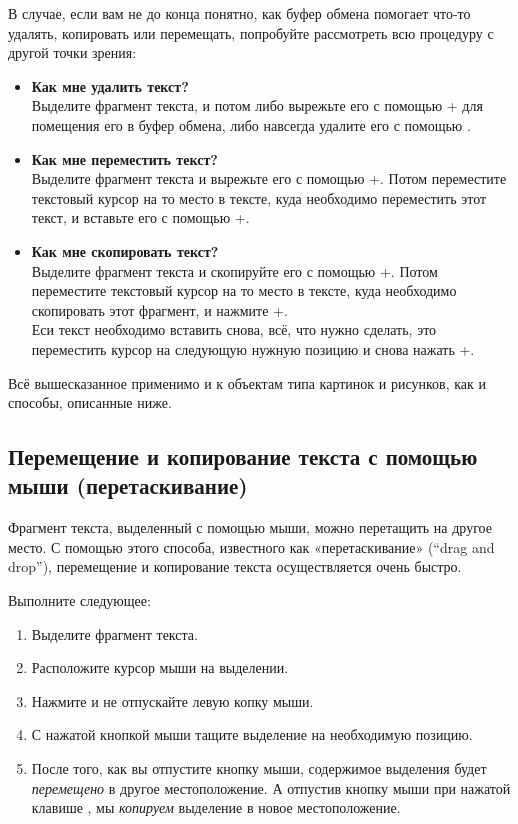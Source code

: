 \documentclass[a4paper,10pt]{article}
\begin{document}
В случае, если вам не до конца понятно, как буфер обмена помогает что-то удалять, копировать или перемещать, попробуйте рассмотреть всю процедуру с другой точки зрения:
\begin{itemize}
 \item \textbf{Как мне удалить текст?}\\
 Выделите фрагмент текста, и потом либо вырежьте его с помощью + для помещения его в буфер обмена, либо навсегда удалите его с помощью .
 \item \textbf{Как мне переместить текст?}\\
Выделите фрагмент текста и вырежьте его с помощью +. Потом переместите текстовый курсор на то место в тексте, куда необходимо переместить этот текст, и вставьте его с помощью +.
\item \textbf{Как мне скопировать текст?}\\
Выделите фрагмент текста и скопируйте его с помощью +. Потом переместите текстовый курсор на то место в тексте, куда необходимо скопировать этот фрагмент, и нажмите +.\\
Еси текст необходимо вставить снова, всё, что нужно сделать, это переместить курсор на следующую нужную позицию и снова нажать +.
\end{itemize}

Всё вышесказанное применимо и к объектам типа картинок и рисунков, как и способы, описанные ниже.

\subsection{Перемещение и копирование текста с помощью мыши (перетаскивание)}
Фрагмент текста, выделенный с помощью мыши, можно перетащить на другое место. С помощью этого способа, известного как «перетаскивание» (“drag and drop”), перемещение и копирование текста осуществляется очень быстро.

Выполните следующее:

\begin{enumerate}
 \item Выделите фрагмент текста.
 \item Расположите курсор мыши на выделении.
 \item Нажмите и не отпускайте левую копку мыши.
 \item С нажатой кнопкой мыши тащите выделение на необходимую позицию.
 \item После того, как вы отпустите кнопку мыши, содержимое выделения будет \textit{перемещено} в другое местоположение. А отпустив кнопку мыши при нажатой клавише , мы \textit{копируем} выделение в новое местоположение.
\end{enumerate}
\end{document}
